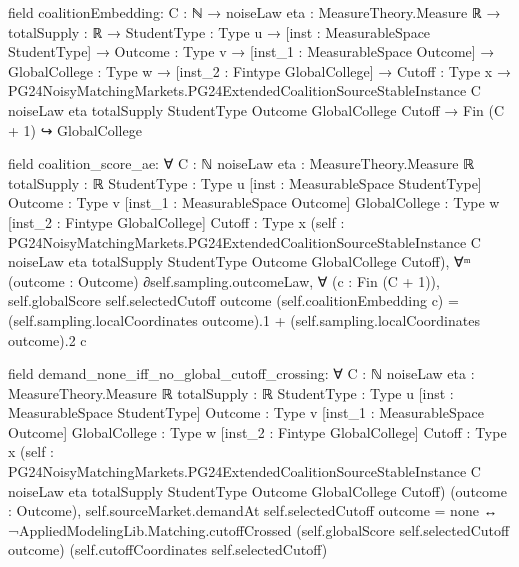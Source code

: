 \documentclass[10pt]{article}
\begin{document}
\begin{ReviewVerbatim}
field coalitionEmbedding:
{C : ℕ} →
  {noiseLaw eta : MeasureTheory.Measure ℝ} →
    {totalSupply : ℝ} →
      {StudentType : Type u} →
        [inst : MeasurableSpace StudentType] →
          {Outcome : Type v} →
            [inst_1 : MeasurableSpace Outcome] →
              {GlobalCollege : Type w} →
                [inst_2 : Fintype GlobalCollege] →
                  {Cutoff : Type x} →
                    PG24NoisyMatchingMarkets.PG24ExtendedCoalitionSourceStableInstance C noiseLaw eta totalSupply
                        StudentType Outcome GlobalCollege Cutoff →
                      Fin (C + 1) ↪ GlobalCollege

field coalition_score_ae:
∀ {C : ℕ} {noiseLaw eta : MeasureTheory.Measure ℝ} {totalSupply : ℝ} {StudentType : Type u}
  [inst : MeasurableSpace StudentType] {Outcome : Type v} [inst_1 : MeasurableSpace Outcome] {GlobalCollege : Type w}
  [inst_2 : Fintype GlobalCollege] {Cutoff : Type x}
  (self :
    PG24NoisyMatchingMarkets.PG24ExtendedCoalitionSourceStableInstance C noiseLaw eta totalSupply StudentType Outcome
      GlobalCollege Cutoff),
  ∀ᵐ (outcome : Outcome) ∂self.sampling.outcomeLaw,
    ∀ (c : Fin (C + 1)),
      self.globalScore self.selectedCutoff outcome (self.coalitionEmbedding c) =
        (self.sampling.localCoordinates outcome).1 + (self.sampling.localCoordinates outcome).2 c

field demand_none_iff_no_global_cutoff_crossing:
∀ {C : ℕ} {noiseLaw eta : MeasureTheory.Measure ℝ} {totalSupply : ℝ} {StudentType : Type u}
  [inst : MeasurableSpace StudentType] {Outcome : Type v} [inst_1 : MeasurableSpace Outcome] {GlobalCollege : Type w}
  [inst_2 : Fintype GlobalCollege] {Cutoff : Type x}
  (self :
    PG24NoisyMatchingMarkets.PG24ExtendedCoalitionSourceStableInstance C noiseLaw eta totalSupply StudentType Outcome
      GlobalCollege Cutoff)
  (outcome : Outcome),
  self.sourceMarket.demandAt self.selectedCutoff outcome = none ↔
    ¬AppliedModelingLib.Matching.cutoffCrossed (self.globalScore self.selectedCutoff outcome)
        (self.cutoffCoordinates self.selectedCutoff)
\end{ReviewVerbatim}
\end{document}
